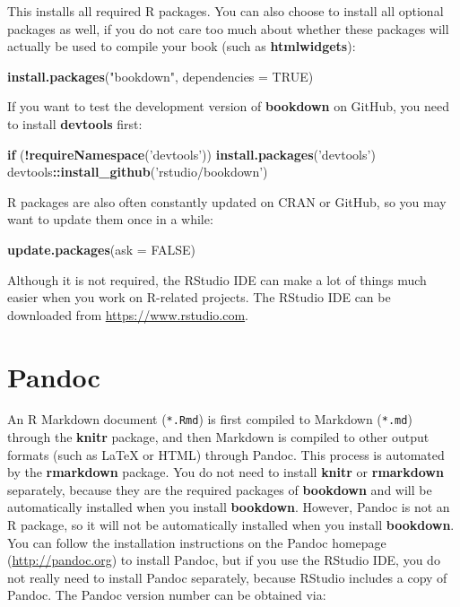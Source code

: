 \documentclass[
  12pt,
]{krantz}
\makeatletter
\newenvironment{Shaded}{\begin{snugshade}}{\end{snugshade}}
\newcommand{\ControlFlowTok}[1]{\textcolor[rgb]{0.13,0.29,0.53}{\textbf{#1}}}
\newcommand{\DataTypeTok}[1]{\textcolor[rgb]{0.13,0.29,0.53}{#1}}
\newcommand{\KeywordTok}[1]{\textcolor[rgb]{0.13,0.29,0.53}{\textbf{#1}}}
\newcommand{\NormalTok}[1]{#1}
\newcommand{\OperatorTok}[1]{\textcolor[rgb]{0.81,0.36,0.00}{\textbf{#1}}}
\newcommand{\OtherTok}[1]{\textcolor[rgb]{0.56,0.35,0.01}{#1}}
\newcommand{\StringTok}[1]{\textcolor[rgb]{0.31,0.60,0.02}{#1}}
\newenvironment{kframe}{%
\medskip{}
\setlength{\fboxsep}{.8em}
 \def\at@end@of@kframe{}%
 \ifinner\ifhmode%
  \def\at@end@of@kframe{\end{minipage}}%
  \begin{minipage}{\columnwidth}%
 \fi\fi%
 \def\FrameCommand##1{\hskip\@totalleftmargin \hskip-\fboxsep
 \colorbox{shadecolor}{##1}\hskip-\fboxsep
     \hskip-\linewidth \hskip-\@totalleftmargin \hskip\columnwidth}%
 \MakeFramed {\advance\hsize-\width
   \@totalleftmargin\z@ \linewidth\hsize
   \@setminipage}}%
 {\par\unskip\endMakeFramed%
 \at@end@of@kframe}
\renewenvironment{Shaded}{\begin{kframe}}{\end{kframe}}
\theoremstyle{definition}
\theoremstyle{definition}
\theoremstyle{definition}
\theoremstyle{remark}
\makeatother
\begin{document}
This installs all required R packages. You can also choose to install all optional packages as well, if you do not care too much about whether these packages will actually be used to compile your book (such as \textbf{htmlwidgets}):

\begin{Shaded}
\begin{Highlighting}[]
\KeywordTok{install.packages}\NormalTok{(}\StringTok{"bookdown"}\NormalTok{, }\DataTypeTok{dependencies =} \OtherTok{TRUE}\NormalTok{)}
\end{Highlighting}
\end{Shaded}

If you want to test the development version of \textbf{bookdown} on GitHub, you need to install \textbf{devtools} first:

\begin{Shaded}
\begin{Highlighting}[]
\ControlFlowTok{if}\NormalTok{ (}\OperatorTok{!}\KeywordTok{requireNamespace}\NormalTok{(}\StringTok{'devtools'}\NormalTok{)) }\KeywordTok{install.packages}\NormalTok{(}\StringTok{'devtools'}\NormalTok{)}
\NormalTok{devtools}\OperatorTok{::}\KeywordTok{install_github}\NormalTok{(}\StringTok{'rstudio/bookdown'}\NormalTok{)}
\end{Highlighting}
\end{Shaded}

R packages are also often constantly updated on CRAN or GitHub, so you may want to update them once in a while:

\begin{Shaded}
\begin{Highlighting}[]
\KeywordTok{update.packages}\NormalTok{(}\DataTypeTok{ask =} \OtherTok{FALSE}\NormalTok{)}
\end{Highlighting}
\end{Shaded}

Although it is not required, the RStudio IDE can make a lot of things much easier when you work on R-related projects. The RStudio IDE can be downloaded from \url{https://www.rstudio.com}.

\hypertarget{pandoc}{%
\section{Pandoc}\label{pandoc}}

An R Markdown document (\texttt{*.Rmd}) is first compiled to Markdown (\texttt{*.md}) through the \textbf{knitr} package, and then Markdown is compiled to other output formats (such as LaTeX or HTML) through Pandoc. This process is automated by the \textbf{rmarkdown} package. You do not need to install \textbf{knitr} or \textbf{rmarkdown} separately, because they are the required packages of \textbf{bookdown} and will be automatically installed when you install \textbf{bookdown}. However, Pandoc is not an R package, so it will not be automatically installed when you install \textbf{bookdown}. You can follow the installation instructions on the Pandoc homepage (\url{http://pandoc.org}) to install Pandoc, but if you use the RStudio IDE, you do not really need to install Pandoc separately, because RStudio includes a copy of Pandoc. The Pandoc version number can be obtained via:
\end{document}
